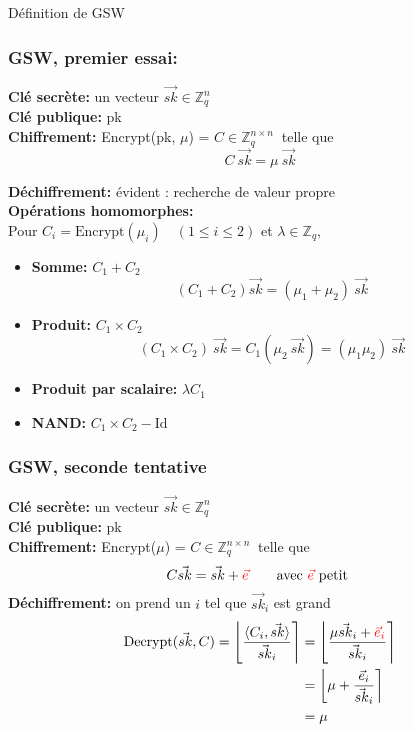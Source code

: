 \documentclass[10pt,xcolor={usenames,dvipsnames}]{beamer}
\newcommand{\ZZq}{\mathbb{Z}_q}
\begin{document}


\begin{section}{Définition de GSW}

\begin{frame} 
\frametitle{GSW, premier essai:}
\textbf{Clé secrète:} un vecteur $\vec{sk} \in \ZZq^{n}$ \\
\textbf{Clé publique:} pk\\
\textbf{Chiffrement:} Encrypt(pk, $\mu$) = $C\in \ZZq^{n \times n}\:$ telle que  
\[C\: \vec{sk} = \mu\:\vec{sk}\]
\vspace{-0.6cm}

\textbf{Déchiffrement:} évident : recherche de valeur propre \\
\textbf{Opérations homomorphes:}\\
Pour {\small$C_i = \text{Encrypt}(\mu_i) \quad(1 \leqslant i \leqslant 2)$}
et $\lambda \in \ZZq$,
\begin{itemize}
\item \textbf{Somme:} $C_1 + C_2\quad$
\[\left(C_1 + C_2\right) \vec{sk} = (\mu_1 + \mu_2)\: \vec{sk}\]
\item \textbf{Produit:} $C_1 \times C_2\quad$
\[\left(C_1 \times C_2\right)\: \vec{sk} = C_1\left(\mu_2\:\vec{sk}\right) = (\mu_1 \mu_2)\:\vec{sk}\]
\item \textbf{Produit par scalaire:} $\lambda C_1\quad$
\item \textbf{NAND:} $C_1 \times C_2 - \text{Id}$
\end{itemize}
\end{frame} 


\begin{frame} 
\frametitle{GSW, seconde tentative}
\textbf{Clé secrète:} un vecteur $\vec{sk} \in \ZZq^{n}$ \\
\textbf{Clé publique:} pk\\
\textbf{Chiffrement:} Encrypt($\mu$) = $C\in \ZZq^{n \times n}\:$ telle que  
\[C \vec{sk} = \vec{sk} + {\color{red}\vec{e}}\qquad \text{avec }  {\color{red}\vec{e}} \text{ petit} \]
\textbf{Déchiffrement:} on prend un $i$ tel que $\vec{sk}_i$ est grand
\begin{align*}
\text{Decrypt}(\vec{sk}, C) = \left\lfloor \frac{\langle C_i, \vec{sk}\rangle}{\vec{sk}_i} \right\rceil &= 
\left\lfloor \frac{{\mu\vec{sk}_i + {\color{red}\vec{e}_i}}}{\vec{sk}_i} \right\rceil \\
&= \left\lfloor \mu + \frac{\vec{e}_i}{\vec{sk}_i} \right\rceil \\
&= \mu
\end{align*}
\end{frame} 


\end{section}
\end{document}
